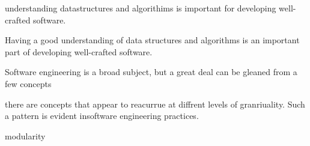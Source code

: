 understanding datastructures and algorithims is important for developing well-crafted software.

Having a good understanding of data structures and algorithms is an important part of developing well-crafted software. 

Software engineering is a broad subject, but a great deal can be gleaned from a few concepts


there are concepts that appear to reacurrue at diffrent levels of granriuality. Such a pattern is evident insoftware engineering practices.

modularity




